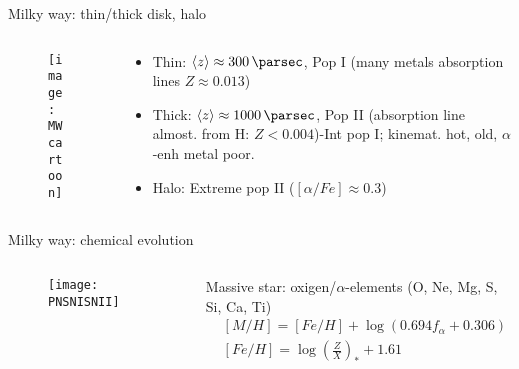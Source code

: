 \begin{frame}{Milky way: thin/thick disk, halo}
\begin{columns}[T]
\begin{column}{0.5\textwidth}
\begin{figure}[!ht]\texttt{[image: MWcartoon]}\label{fig:MWcartoon}\end{figure}
\end{column}
\begin{column}{0.45\textwidth}
\begin{itemize}
\item Thin: $\exv{z}\approx\SI{300}{\parsec}$, Pop I (many metals absorption lines $Z\approx0.013$)
\item Thick: $\exv{z}\approx\SI{1000}{\parsec}$, Pop II (absorption line almost. from H: $Z<0.004$)-Int pop I; kinemat. hot, old, $\alpha$-enh metal poor.
\item Halo: Extreme pop II ($[\alpha/Fe]\approx0.3$)
\end{itemize}
\end{column}
\end{columns}
\end{frame}

\begin{frame}{Milky way: chemical evolution}
\begin{columns}[T]
\begin{column}{0.5\textwidth}
\begin{figure}[!ht]\texttt{[image: PNSNISNII]}\label{fig:PNSNISNII}
\end{figure}
\end{column}
\begin{column}{0.45\textwidth}
Massive star: oxigen/$\alpha$-elements (O, Ne, Mg, S, Si, Ca, Ti)
\begin{align*}
&[M/H]=[Fe/H]+\log{(0.694f_{\alpha}+0.306)}\\
&[Fe/H]=\log{(\frac{Z}{X})_*}+1.61
\end{align*}
\end{column}
\end{columns}
\end{frame}

